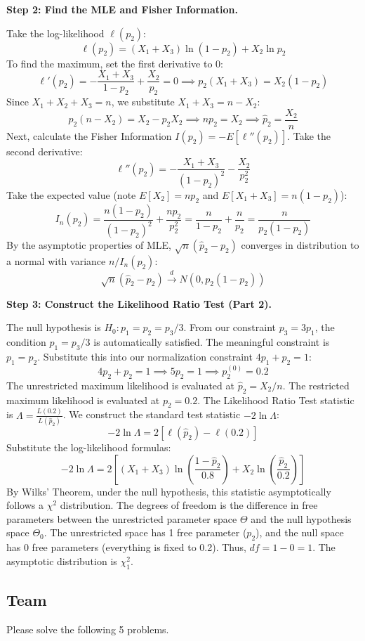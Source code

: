 \begin{solution}
\textbf{Step 2: Find the MLE and Fisher Information.}

Take the log-likelihood $\ell(p_2)$:
\[ \ell(p_2) = (X_1+X_3) \ln(1-p_2) + X_2 \ln p_2 \]
To find the maximum, set the first derivative to 0:
\[ \ell'(p_2) = -\frac{X_1+X_3}{1-p_2} + \frac{X_2}{p_2} = 0 \implies p_2(X_1+X_3) = X_2(1-p_2) \]
Since $X_1+X_2+X_3 = n$, we substitute $X_1+X_3 = n - X_2$:
\[ p_2(n - X_2) = X_2 - p_2 X_2 \implies n p_2 = X_2 \implies \hat{p}_2 = \frac{X_2}{n} \]
Next, calculate the Fisher Information $I(p_2) = -E[\ell''(p_2)]$. Take the second derivative:
\[ \ell''(p_2) = -\frac{X_1+X_3}{(1-p_2)^2} - \frac{X_2}{p_2^2} \]
Take the expected value (note $E[X_2] = n p_2$ and $E[X_1+X_3] = n(1-p_2)$):
\[ I_n(p_2) = \frac{n(1-p_2)}{(1-p_2)^2} + \frac{n p_2}{p_2^2} = \frac{n}{1-p_2} + \frac{n}{p_2} = \frac{n}{p_2(1-p_2)} \]
By the asymptotic properties of MLE, $\sqrt{n}(\hat{p}_2 - p_2)$ converges in distribution to a normal with variance $n / I_n(p_2)$:
\[ \sqrt{n}(\hat{p}_2 - p_2) \xrightarrow{d} N(0, p_2(1-p_2)) \]

\textbf{Step 3: Construct the Likelihood Ratio Test (Part 2).}

The null hypothesis is $H_0: p_1 = p_2 = p_3/3$.
From our constraint $p_3 = 3p_1$, the condition $p_1 = p_3/3$ is automatically satisfied. The meaningful constraint is $p_1 = p_2$.
Substitute this into our normalization constraint $4p_1 + p_2 = 1$:
\[ 4p_2 + p_2 = 1 \implies 5p_2 = 1 \implies p_2^{(0)} = 0.2 \]
The unrestricted maximum likelihood is evaluated at $\hat{p}_2 = X_2/n$. The restricted maximum likelihood is evaluated at $p_2 = 0.2$.
The Likelihood Ratio Test statistic is $\Lambda = \frac{L(0.2)}{L(\hat{p}_2)}$. We construct the standard test statistic $-2 \ln \Lambda$:
\[ -2 \ln \Lambda = 2 \left[ \ell(\hat{p}_2) - \ell(0.2) \right] \]
Substitute the log-likelihood formulas:
\[ -2 \ln \Lambda = 2 \left[ (X_1+X_3) \ln\left(\frac{1-\hat{p}_2}{0.8}\right) + X_2 \ln\left(\frac{\hat{p}_2}{0.2}\right) \right] \]
By Wilks' Theorem, under the null hypothesis, this statistic asymptotically follows a $\chi^2$ distribution. The degrees of freedom is the difference in free parameters between the unrestricted parameter space $\Theta$ and the null hypothesis space $\Theta_0$.
The unrestricted space has 1 free parameter ($p_2$), and the null space has 0 free parameters (everything is fixed to 0.2).
Thus, $df = 1 - 0 = 1$. The asymptotic distribution is $\chi^2_1$.
\end{solution}

\subsection{Team}
Please solve the following 5 problems.

